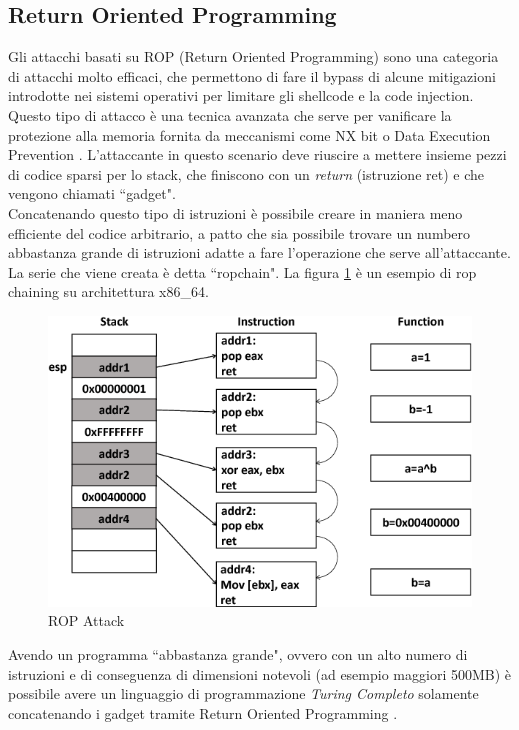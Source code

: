 \subsection*{Return Oriented Programming}
Gli attacchi basati su ROP (Return Oriented Programming) sono una categoria di attacchi molto efficaci, che permettono di fare il bypass di alcune mitigazioni introdotte nei sistemi operativi per limitare gli shellcode \cite{TeamFormationShellcoding} e la code injection.\\
\newline
Questo tipo di attacco è una tecnica avanzata che serve per vanificare la protezione alla memoria fornita da meccanismi come NX bit o  Data Execution Prevention \cite{MicrosoftDEP}. L'attaccante in questo scenario deve riuscire a mettere insieme pezzi di codice sparsi per lo stack, che finiscono con un \textit{return} (istruzione ret) e che vengono chiamati ``gadget".\\
Concatenando questo tipo di istruzioni è possibile creare in maniera meno efficiente del codice arbitrario, a patto che sia possibile trovare un numbero abbastanza grande di istruzioni adatte a fare l'operazione che serve all'attaccante. La serie che viene creata è detta ``ropchain". La figura \ref{ref:ropx86} è un esempio di rop chaining su architettura x86\_64.
\vspace{1cm}
\FloatBarrier
\begin{figure}[!htbp]
    \centering
    \includegraphics[width=0.7\linewidth]{images/rop-stack.png}
    \caption{ROP Attack}
    \label{ref:ropx86}
\end{figure}
\FloatBarrier
\vspace{1cm}
Avendo un programma ``abbastanza grande", ovvero con un alto numero di istruzioni e di conseguenza di dimensioni notevoli (ad esempio maggiori 500MB) è possibile avere un linguaggio di programmazione \textit{Turing Completo} solamente concatenando i gadget tramite Return Oriented Programming \cite{researchgateROP}. \\
